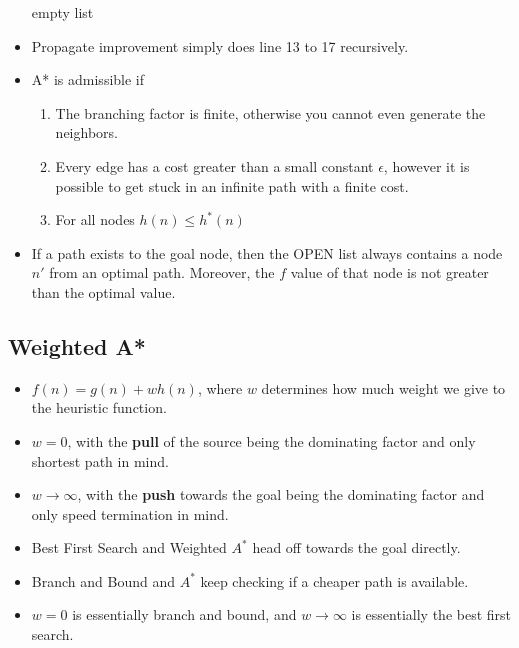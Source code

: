\documentclass[a4paper]{article}
\begin{document}
\begin{itemize}
\begin{algorithm}[H]
\begin{algorithmic}[1]
                        \EndIf
                    \EndIf
                \EndFor
            \EndWhile
            \Return empty list
        \end{algorithmic}
    \end{algorithm}
    \item Propagate improvement simply does line 13 to 17 recursively.
    \item A* is admissible if
    \begin{enumerate}
        \item The branching factor is finite, otherwise you cannot even generate the neighbors.
        \item Every edge has a cost greater than a small constant $\epsilon$, however it is possible to get stuck in an infinite path with a finite cost.
        \item For all nodes $h(n)\leq h^*(n)$
    \end{enumerate}
    \item If a path exists to the goal node, then the OPEN list always contains a node $n'$ from an optimal path. Moreover, the $f$ value of that node is not greater than the optimal value.
\end{itemize}

\subsection{Weighted A*}
\begin{itemize}
    \item $f(n)=g(n)+wh(n)$, where $w$ determines how much weight we give to the heuristic function.
    \item $w=0$, with the \textbf{pull} of the source being the dominating factor and only shortest path in mind.
    \item $w\to \infty$, with the \textbf{push} towards the goal being the dominating factor and only speed termination in mind.
    \item Best First Search and Weighted $A^*$ head off towards the goal directly.
    \item Branch and Bound and $A^*$ keep checking if a cheaper path is available.
    \item $w=0$ is essentially branch and bound, and $w\to \infty$ is essentially the best first search.
\end{itemize}
\end{document}
